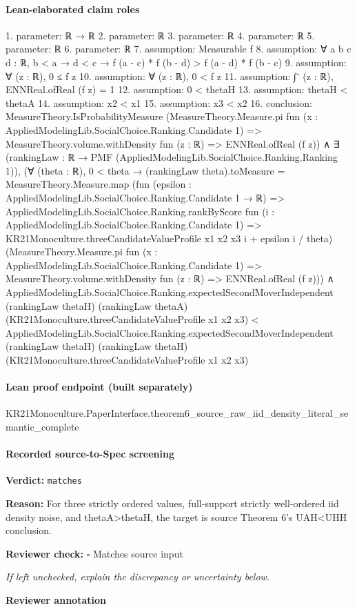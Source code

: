 \documentclass[10pt]{article}
\newcommand{\reviewerbox}{%
  \par\noindent\fbox{\parbox{0.96\linewidth}{\rule{0pt}{0.38in}}}\par
}
\newcommand{\reviewmatch}[1]{%
  \par\noindent\textbf{Reviewer check:} $\square$\; #1\par
  \noindent\emph{If left unchecked, explain the discrepancy or uncertainty below.}\par
}
\begin{document}
\paragraph{Lean-elaborated claim roles}\begin{ReviewVerbatim}
1. parameter: ℝ → ℝ
2. parameter: ℝ
3. parameter: ℝ
4. parameter: ℝ
5. parameter: ℝ
6. parameter: ℝ
7. assumption: Measurable f
8. assumption: ∀ {{a b c d : ℝ}}, b < a → d < c → f (a - c) * f (b - d) > f (a - d) * f (b - c)
9. assumption: ∀ (z : ℝ), 0 ≤ f z
10. assumption: ∀ (z : ℝ), 0 < f z
11. assumption: ∫⁻ (z : ℝ), ENNReal.ofReal (f z) = 1
12. assumption: 0 < thetaH
13. assumption: thetaH < thetaA
14. assumption: x2 < x1
15. assumption: x3 < x2
16. conclusion: MeasureTheory.IsProbabilityMeasure
    (MeasureTheory.Measure.pi fun (x : AppliedModelingLib.SocialChoice.Ranking.Candidate 1) =>
      MeasureTheory.volume.withDensity fun (z : ℝ) => ENNReal.ofReal (f z)) ∧
  ∃ (rankingLaw : ℝ → PMF (AppliedModelingLib.SocialChoice.Ranking.Ranking 1)),
    (∀ (theta : ℝ),
        0 < theta →
          (rankingLaw theta).toMeasure =
            MeasureTheory.Measure.map
              (fun (epsilon : AppliedModelingLib.SocialChoice.Ranking.Candidate 1 → ℝ) =>
                AppliedModelingLib.SocialChoice.Ranking.rankByScore
                  fun (i : AppliedModelingLib.SocialChoice.Ranking.Candidate 1) =>
                  KR21Monoculture.threeCandidateValueProfile x1 x2 x3 i + epsilon i / theta)
              (MeasureTheory.Measure.pi fun (x : AppliedModelingLib.SocialChoice.Ranking.Candidate 1) =>
                MeasureTheory.volume.withDensity fun (z : ℝ) => ENNReal.ofReal (f z))) ∧
      AppliedModelingLib.SocialChoice.Ranking.expectedSecondMoverIndependent (rankingLaw thetaH) (rankingLaw thetaA)
          (KR21Monoculture.threeCandidateValueProfile x1 x2 x3) <
        AppliedModelingLib.SocialChoice.Ranking.expectedSecondMoverIndependent (rankingLaw thetaH) (rankingLaw thetaH)
          (KR21Monoculture.threeCandidateValueProfile x1 x2 x3)
\end{ReviewVerbatim}

\paragraph{Lean proof endpoint (built separately)}\begin{ReviewVerbatim}
KR21Monoculture.PaperInterface.theorem6_source_raw_iid_density_literal_semantic_complete
\end{ReviewVerbatim}

\paragraph{Recorded source-to-Spec screening}
\textbf{Verdict:} \texttt{matches}
\\
{\raggedright
\textbf{Reason:} For three strictly ordered values, full-\allowbreak{}support strictly well-\allowbreak{}ordered iid density noise, and thetaA>thetaH, the target is source Theorem 6's UAH<UHH conclusion.\allowbreak{}
\par}
\reviewmatch{Matches source input}
\noindent\textbf{Reviewer annotation}\par
\reviewerbox
\clearpage
\hypertarget{source-claim-d7ed4659ca9b332e}{}
\end{document}
